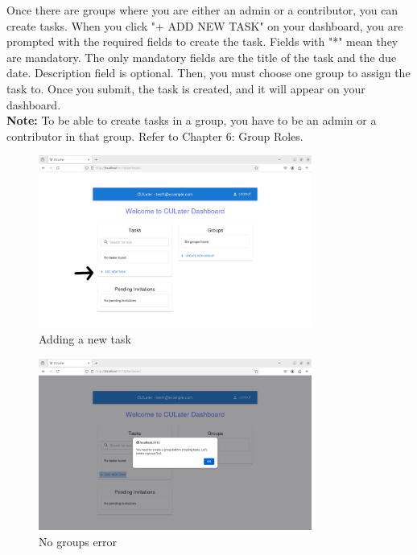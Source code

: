 \documentclass{scrreprt}
\begin{document}
Once there are groups where you are either an admin or a contributor, you can create tasks. When you click "+ ADD NEW TASK" on your dashboard, you are prompted with the required fields to create the task. Fields with "*" mean they are mandatory. The only mandatory fields are the title of the task and the due date. Description field is optional. Then, you must choose one group to assign the task to. Once you submit, the task is created, and it will appear on your dashboard.\\

\textbf{Note:} To be able to create tasks in a group, you have to be an admin or a contributor in that group. Refer to Chapter 6: Group Roles.\\
\begin{figure}[htbp]
        \centering
        \includegraphics[width=0.8\textwidth]{dashboard_add_task.png}
	\caption{Adding a new task}
	\label{fig:my_label}
\end{figure}
\begin{figure}[htbp]
        \centering
        \includegraphics[width=0.8\textwidth]{create_task_no_group.png}
	\caption{No groups error}
	\label{fig:my_label}
\end{figure}
\end{document}

